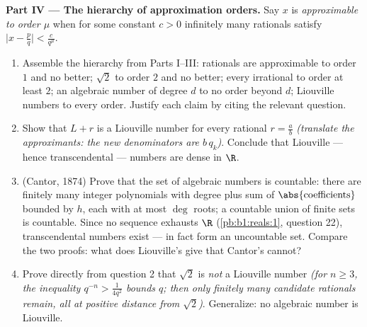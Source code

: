 \begin{problem}
\medskip
\noindent\textbf{Part IV --- The hierarchy of approximation
orders.} Say $x$ is \emph{approximable to order $\mu$} when for
some constant $c > 0$ infinitely many rationals satisfy
$\bigl|x - \frac pq\bigr| < \frac{c}{q^{\mu}}$.
\begin{enumerate}[resume]
  \item Assemble the hierarchy from Parts I--III: rationals are
        approximable to order $1$ and no better; $\sqrt 2$ to
        order $2$ and no better; every irrational to order at
        least $2$; an algebraic number of degree $d$ to no order
        beyond $d$; Liouville numbers to every order. Justify
        each claim by citing the relevant question.
  \item Show that $L + r$ is a Liouville number for every
        rational $r = \frac ab$ \emph{(translate the
        approximants: the new denominators are $b\,q_k$)}.
        Conclude that Liouville --- hence transcendental ---
        numbers are dense in $\R$.
  \item (Cantor, 1874) Prove that the set of algebraic numbers
        is countable: there are finitely many integer
        polynomials with degree plus sum of $\abs{\text{coefficients}}$
        bounded by $h$, each with at most $\deg$ roots; a
        countable union of finite sets is countable. Since no
        sequence exhausts $\R$ (\cref{pb:b1:reals:1}, question
        22), transcendental numbers exist --- in fact form an
        uncountable set. Compare the two proofs: what does
        Liouville's give that Cantor's cannot?
  \item Prove directly from question 2 that $\sqrt 2$ is
        \emph{not} a Liouville number \emph{(for $n \geq 3$,
        the inequality $q^{-n} > \frac{1}{4q^2}$ bounds $q$;
        then only finitely many candidate rationals remain, all
        at positive distance from $\sqrt2$)}. Generalize:
        no algebraic number is Liouville.
\end{enumerate}


\end{problem}
